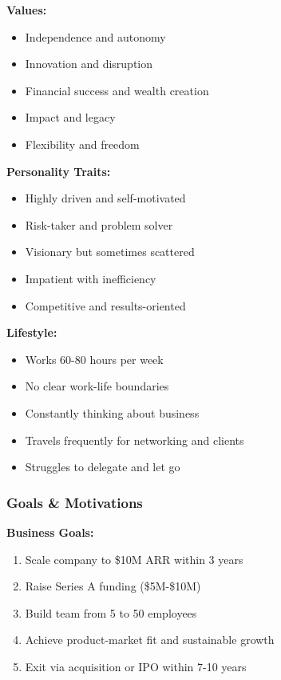 \textbf{Values:}
\begin{itemize}
    \item Independence and autonomy
    \item Innovation and disruption
    \item Financial success and wealth creation
    \item Impact and legacy
    \item Flexibility and freedom
\end{itemize}

\textbf{Personality Traits:}
\begin{itemize}
    \item Highly driven and self-motivated
    \item Risk-taker and problem solver
    \item Visionary but sometimes scattered
    \item Impatient with inefficiency
    \item Competitive and results-oriented
\end{itemize}

\textbf{Lifestyle:}
\begin{itemize}
    \item Works 60-80 hours per week
    \item No clear work-life boundaries
    \item Constantly thinking about business
    \item Travels frequently for networking and clients
    \item Struggles to delegate and let go
\end{itemize}

\subsubsection{Goals \& Motivations}

\textbf{Business Goals:}
\begin{enumerate}
    \item Scale company to \$10M ARR within 3 years
    \item Raise Series A funding (\$5M-\$10M)
    \item Build team from 5 to 50 employees
    \item Achieve product-market fit and sustainable growth
    \item Exit via acquisition or IPO within 7-10 years
\end{enumerate}

